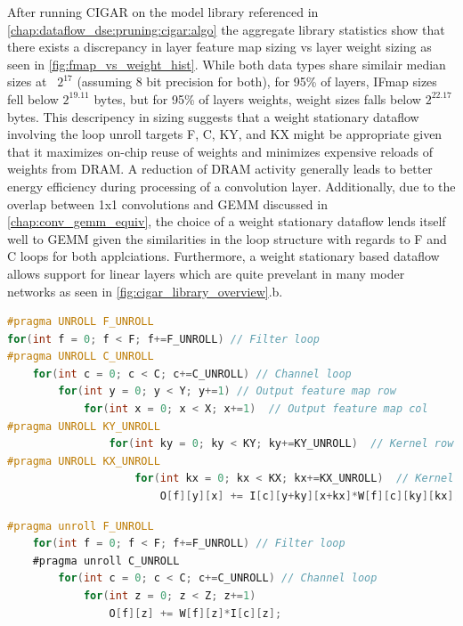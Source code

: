After running CIGAR on the model library referenced in
\autoref{chap:dataflow_dse:pruning:cigar:algo} the aggregate library statistics
show that there exists a discrepancy in layer feature map sizing vs layer weight
sizing as seen in \autoref{fig:fmap_vs_weight_hist}. While both data types share
similair median sizes at ~$2^{17}$ (assuming 8 bit precision for both), for 95\%
of layers, IFmap sizes fell below $2^{19.11}$ bytes, but for 95\% of layers
weights, weight sizes falls below $2^{22.17}$ bytes. This descripency in sizing
suggests that a weight stationary dataflow involving the loop unroll targets F,
C, KY, and KX might be appropriate given that it maximizes on-chip reuse of
weights and minimizes expensive reloads of weights from DRAM. A reduction of
DRAM activity generally leads to better energy efficiency during processing of a
convolution layer. Additionally, due to the overlap between 1x1 convolutions and
GEMM discussed in \autoref{chap:conv_gemm_equiv}, the choice of a weight
stationary dataflow lends itself well to \ac{GEMM} given the similarities in the
loop structure with regards to F and C loops for both applciations. Furthermore,
a weight stationary based dataflow allows support for linear layers which are
quite prevelant in many moder networks as seen in
\autoref{fig:cigar_library_overview}.b.

\clearpage
\begin{lstlisting}[language=C, caption=Weight stationary dataflow, label={lst:conv_loop}]
#pragma UNROLL F_UNROLL
for(int f = 0; f < F; f+=F_UNROLL) // Filter loop
#pragma UNROLL C_UNROLL
    for(int c = 0; c < C; c+=C_UNROLL) // Channel loop
        for(int y = 0; y < Y; y+=1) // Output feature map row
            for(int x = 0; x < X; x+=1)  // Output feature map col
#pragma UNROLL KY_UNROLL
                for(int ky = 0; ky < KY; ky+=KY_UNROLL)  // Kernel row
#pragma UNROLL KX_UNROLL
                    for(int kx = 0; kx < KX; kx+=KX_UNROLL)  // Kernel col
                        O[f][y][x] += I[c][y+ky][x+kx]*W[f][c][ky][kx];
\end{lstlisting}

\begin{lstlisting}[language=C, caption=GEMM loops, label={lst:W_S_Generic_Loop}]
    #pragma unroll F_UNROLL
    for(int f = 0; f < F; f+=F_UNROLL) // Filter loop
    #pragma unroll C_UNROLL
        for(int c = 0; c < C; c+=C_UNROLL) // Channel loop
            for(int z = 0; z < Z; z+=1)
                O[f][z] += W[f][z]*I[c][z];
\end{lstlisting}


